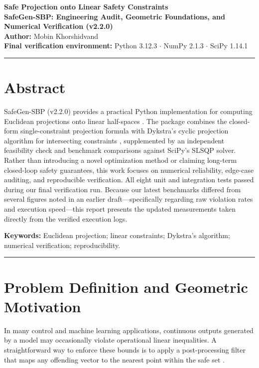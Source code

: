 \documentclass[11pt,a4paper]{article}
\begin{document}
\begin{center}
    {\LARGE \textbf{Safe Projection onto Linear Safety Constraints}}\\[0.5em]
    {\large \textbf{SafeGen-SBP: Engineering Audit, Geometric Foundations, and Numerical Verification (v2.2.0)}}\\[0.75em]
    {\normalsize \textbf{Author:} Mobin Khorshidvand}\\[0.25em]
    {\small \textbf{Final verification environment:} Python 3.12.3 $\cdot$ NumPy 2.1.3 $\cdot$ SciPy 1.14.1}
\end{center}

\vspace{0.5em}
\hrule
\vspace{0.75em}

\section*{Abstract}
SafeGen-SBP (v2.2.0) provides a practical Python implementation for computing Euclidean projections onto linear half-spaces \cite{boyd2004}. The package combines the closed-form single-constraint projection formula with Dykstra's cyclic projection algorithm for intersecting constraints \cite{dykstra1983}, supplemented by an independent feasibility check and benchmark comparisons against SciPy's SLSQP solver. Rather than introducing a novel optimization method or claiming long-term closed-loop safety guarantees, this work focuses on numerical reliability, edge-case auditing, and reproducible verification. All eight unit and integration tests passed during our final verification run. Because our latest benchmarks differed from several figures noted in an earlier draft---specifically regarding raw violation rates and execution speed---this report presents the updated measurements taken directly from the verified execution logs.

\textbf{Keywords:} Euclidean projection; linear constraints; Dykstra's algorithm; numerical verification; reproducibility.

\vspace{0.5em}
\hrule
\vspace{0.75em}

\section{Problem Definition and Geometric Motivation}

In many control and machine learning applications, continuous outputs generated by a model may occasionally violate operational linear inequalities. A straightforward way to enforce these bounds is to apply a post-processing filter that maps any offending vector to the nearest point within the safe set \cite{boyd2004}.
\end{document}
